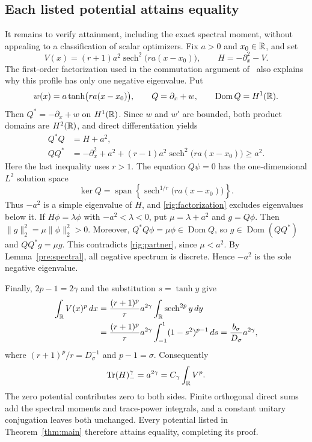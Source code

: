 \subsection{Each listed potential attains equality}

It remains to verify attainment, including the exact spectral moment,
without appealing to a classification of scalar optimizers.  Fix $a>0$
and $x_0\in\mathbb R$, and set
\[
 V(x)=(r+1)a^2\operatorname{sech}^2\bigl(ra(x-x_0)\bigr),
 \qquad H=-\partial_x^2-V.
\]
The first-order factorization used in the commutation argument
of~\cite[Section~II]{BenguriaLoss2000} also explains why this profile has
only one negative eigenvalue.  Put
\[
 w(x)=a\tanh\bigl(ra(x-x_0)\bigr),
 \qquad Q=\partial_x+w,\qquad \operatorname{Dom}Q=H^1(\mathbb R).
\]
Then $Q^*=-\partial_x+w$ on $H^1(\mathbb R)$.  Since $w$ and $w'$ are bounded,
both product domains are $H^2(\mathbb R)$, and direct differentiation yields
\begin{align}
 Q^*Q&=H+a^2,
 \label{rig:factorization}\\
 QQ^*&=-\partial_x^2+a^2
       +(r-1)a^2\operatorname{sech}^2\bigl(ra(x-x_0)\bigr)
       \ge a^2.
 \label{rig:partner}
\end{align}
Here the last inequality uses $r>1$.  The equation $Q\psi=0$ has the
one-dimensional $L^2$ solution space
\[
 \ker Q=
 \operatorname{span}\left\{
    \operatorname{sech}^{1/r}\bigl(ra(x-x_0)\bigr)
 \right\}.
\]
Thus $-a^2$ is a simple eigenvalue of $H$, and
\eqref{rig:factorization} excludes eigenvalues below it.  If
$H\phi=\lambda\phi$ with $-a^2<\lambda<0$, put
$\mu=\lambda+a^2$ and $g=Q\phi$.  Then
$\|g\|_2^2=\mu\|\phi\|_2^2>0$.  Moreover,
$Q^*Q\phi=\mu\phi\in\operatorname{Dom}Q$, so
$g\in\operatorname{Dom}(QQ^*)$ and $QQ^*g=\mu g$.  This contradicts
\eqref{rig:partner}, since $\mu<a^2$.  By Lemma~\ref{pre:spectral},
all negative spectrum is discrete.  Hence $-a^2$ is the sole negative
eigenvalue.

Finally, $2p-1=2\gamma$ and the substitution $s=\tanh y$ give
\begin{align*}
 \int_\mathbb R V(x)^p\,dx
 &=\frac{(r+1)^p}{r}a^{2\gamma}
     \int_\mathbb R\operatorname{sech}^{2p}y\,dy\\
 &=\frac{(r+1)^p}{r}a^{2\gamma}
     \int_{-1}^{1}(1-s^2)^{p-1}\,ds
  =\frac{b_\sigma}{D_\sigma}a^{2\gamma},
\end{align*}
where $(r+1)^p/r=D_\sigma^{-1}$ and $p-1=\sigma$.  Consequently
\[
 \operatorname{Tr}(H)_-^\gamma
   =a^{2\gamma}
   =C_\gamma\int_\mathbb R V^p.
\]
The zero potential contributes zero to both sides.  Finite orthogonal
direct sums add the spectral moments and trace-power integrals, and a
constant unitary conjugation leaves both unchanged.  Every potential
listed in Theorem~\ref{thm:main} therefore attains equality, completing
its proof.
